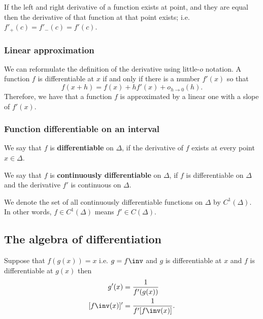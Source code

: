 \documentclass[12pt, a4paper]{article}
\begin{document}
\begin{theorem}
    If the left and right derivative of a function exists at point, and they are equal then the derivative of that function at that point exists; i.e. \(f'_+(c)=f'_-(c)=f'(c)\).
\end{theorem}

\subsubsection{Linear approximation}

We can reformulate the definition of the derivative using little-\(o\) notation. A function \(f\) is differentiable at \(x\) if and only if there is a number \(f'(x)\) so that 
\[f(x+h)=f(x)+hf'(x)+o_{h\to 0}(h).\]
Therefore, we have that a function \(f\) is approximated by a linear one with a slope of \(f'(x)\).

\subsubsection{Function differentiable on an interval}

\begin{definition}
    We say that \(f\) is \textbf{differentiable} on \(\Delta\), if the derivative of \(f\) exists at every point \(x\in \Delta\).
\end{definition}

\begin{definition}
    We say that \(f\) is \textbf{continuously differentiable} on \(\Delta\), if \(f\) is differentiable on \(\Delta\) and the derivative \(f'\) is continuous on \(\Delta\).
\end{definition}

\begin{mdremark}
    We denote the set of all continuously differentiable functions on \(\Delta\) by \(C^1(\Delta)\). In other words, \(f\in C^1(\Delta)\) means \(f'\in C(\Delta)\).
\end{mdremark}

\subsection{The algebra of differentiation}

\begin{mdthm}
    Suppose that \(f(g(x)) =x\) i.e. \(g=f\inv\) and \(g\) is differentiable at \(x\) and \(f\) is differentiable at \(g(x)\) then 
    \[\begin{aligned}
        g'(x)&=\frac{1}{f'(g(x))} \\
        [f\inv(x)]'&=\frac{1}{f'[f\inv(x)]}.
    \end{aligned}\]
\end{mdthm}
\end{document}
